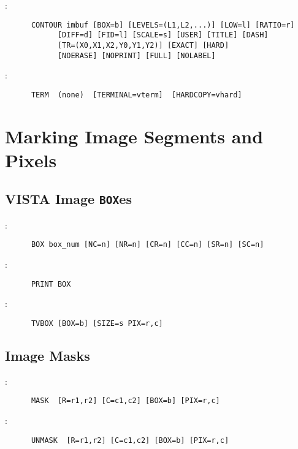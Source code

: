 \noindent {}:
\begin{verbatim}
      CONTOUR imbuf [BOX=b] [LEVELS=(L1,L2,...)] [LOW=l] [RATIO=r]
		    [DIFF=d] [FID=l] [SCALE=s] [USER] [TITLE] [DASH]
		    [TR=(X0,X1,X2,Y0,Y1,Y2)] [EXACT] [HARD]
		    [NOERASE] [NOPRINT] [FULL] [NOLABEL]
\end{verbatim}

\noindent {}:
\begin{verbatim}
      TERM  (none)  [TERMINAL=vterm]  [HARDCOPY=vhard]
\end{verbatim}


\section{Marking Image Segments and Pixels}

\subsection{VISTA Image {\tt BOX}es}

:
\begin{verbatim}
      BOX box_num [NC=n] [NR=n] [CR=n] [CC=n] [SR=n] [SC=n]
\end{verbatim}

\noindent {}:
\begin{verbatim}
      PRINT BOX
\end{verbatim}

\noindent {}:
\begin{verbatim}
      TVBOX [BOX=b] [SIZE=s PIX=r,c]
\end{verbatim}

\subsection{Image Masks}

:
\begin{verbatim}
      MASK  [R=r1,r2] [C=c1,c2] [BOX=b] [PIX=r,c]
\end{verbatim}

\noindent {}:
\begin{verbatim}
      UNMASK  [R=r1,r2] [C=c1,c2] [BOX=b] [PIX=r,c]
\end{verbatim}

